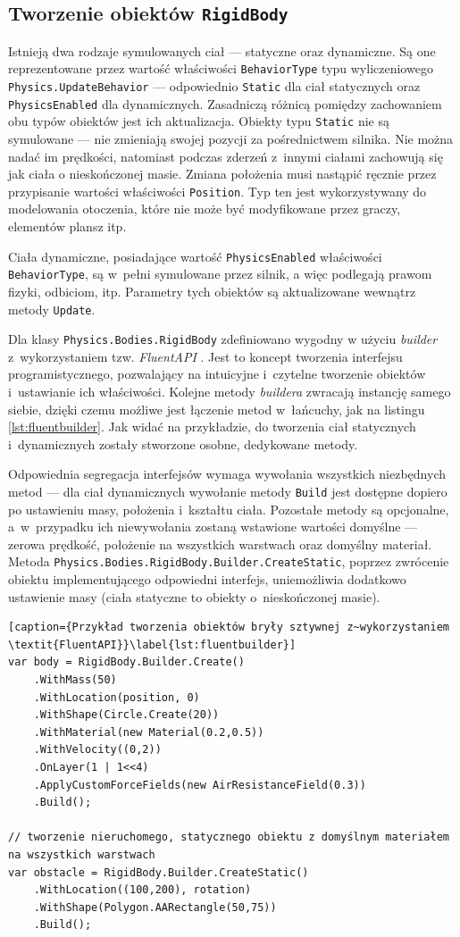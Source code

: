 \subsection{Tworzenie obiektów \texttt{RigidBody}}
Istnieją dwa rodzaje symulowanych ciał --- statyczne oraz dynamiczne. Są one reprezentowane przez wartość właściwości \verb|BehaviorType| typu wyliczeniowego \verb|Physics.UpdateBehavior| --- odpowiednio \verb|Static| dla ciał statycznych oraz \verb|PhysicsEnabled| dla dynamicznych. Zasadniczą różnicą pomiędzy zachowaniem obu typów obiektów jest ich aktualizacja. Obiekty typu \verb|Static| nie są symulowane --- nie zmieniają swojej pozycji za pośrednictwem silnika. Nie można nadać im prędkości, natomiast podczas zderzeń z~innymi ciałami zachowują się jak ciała o nieskończonej masie. Zmiana położenia musi nastąpić ręcznie przez przypisanie wartości właściwości \verb|Position|. Typ ten jest wykorzystywany do modelowania otoczenia, które nie może być modyfikowane przez graczy, elementów plansz itp. 

Ciała dynamiczne, posiadające wartość \verb|PhysicsEnabled| właściwości \verb|BehaviorType|, są w~pełni symulowane przez silnik, a więc podlegają prawom fizyki, odbiciom, itp. Parametry tych obiektów są aktualizowane wewnątrz metody \verb|Update|.

Dla klasy \verb|Physics.Bodies.RigidBody| zdefiniowano wygodny w użyciu \textit{builder} z~wykorzystaniem tzw. \textit{FluentAPI} \cite{bib:fluentapi}. Jest to koncept tworzenia interfejsu programistycznego, pozwalający na intuicyjne i~czytelne tworzenie obiektów i~ustawianie ich właściwości. Kolejne metody \textit{buildera} zwracają instancję samego siebie, dzięki czemu możliwe jest łączenie metod w~łańcuchy, jak na listingu \ref{lst:fluentbuilder}. Jak widać na przykładzie, do tworzenia ciał statycznych i~dynamicznych zostały stworzone osobne, dedykowane metody. 

Odpowiednia segregacja interfejsów wymaga wywołania wszystkich niezbędnych metod --- dla ciał dynamicznych wywołanie metody \verb|Build| jest dostępne dopiero po ustawieniu masy, położenia i~kształtu ciała. Pozostałe metody są opcjonalne, a~w~przypadku ich niewywołania zostaną wstawione wartości domyślne --- zerowa prędkość, położenie na wszystkich warstwach oraz domyślny materiał. Metoda \verb|Physics.Bodies.RigidBody.Builder.CreateStatic|, poprzez zwrócenie obiektu implementującego odpowiedni interfejs, uniemożliwia dodatkowo ustawienie masy (ciała statyczne to obiekty o~nieskończonej masie).
\begin{lstlisting}[caption={Przykład tworzenia obiektów bryły sztywnej z~wykorzystaniem \textit{FluentAPI}}\label{lst:fluentbuilder}]
var body = RigidBody.Builder.Create()
	.WithMass(50)
	.WithLocation(position, 0)
	.WithShape(Circle.Create(20))
	.WithMaterial(new Material(0.2,0.5))
	.WithVelocity((0,2))
	.OnLayer(1 | 1<<4)
	.ApplyCustomForceFields(new AirResistanceField(0.3))
	.Build();

// tworzenie nieruchomego, statycznego obiektu z domyślnym materiałem na wszystkich warstwach
var obstacle = RigidBody.Builder.CreateStatic()
	.WithLocation((100,200), rotation)
	.WithShape(Polygon.AARectangle(50,75))
	.Build();
\end{lstlisting}

